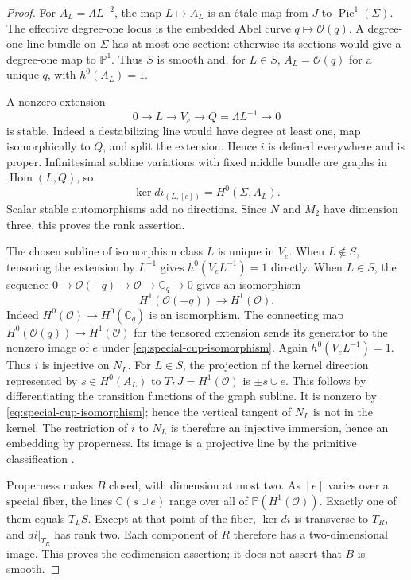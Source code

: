 \documentclass[11pt]{amsart}
\theoremstyle{definition}
\theoremstyle{remark}
\theoremstyle{plain}
\newcommand{\CC}{\mathbb{C}}
\newcommand{\PP}{\mathbb{P}}
\newcommand{\Hom}{\operatorname{Hom}}
\begin{document}
\begin{proof}
For $A_L=\Lambda L^{-2}$, the map $L\mapsto A_L$ is an
\'etale map from $J$ to $\operatorname{Pic}^1(\Sigma)$.
The effective degree-one locus is the embedded Abel curve
$q\mapsto\mathcal O(q)$. A degree-one line bundle on $\Sigma$
has at most one section: otherwise its sections would give a
degree-one map to $\PP^1$. Thus $S$ is smooth and, for $L\in S$,
$A_L=\mathcal O(q)$ for a unique $q$, with $h^0(A_L)=1$.

A nonzero extension
\[
 0\longrightarrow L\longrightarrow V_e
       \longrightarrow Q=\Lambda L^{-1}\longrightarrow0
\]
is stable. Indeed a destabilizing line would have degree at least
one, map isomorphically to $Q$, and split the extension.
Hence $i$ is defined everywhere and is proper. Infinitesimal
subline variations with fixed middle bundle are graphs in
$\Hom(L,Q)$, so
\begin{equation}\label{eq:special-extension-differential}
            \ker di_{(L,[e])}=H^0(\Sigma,A_L).
\end{equation}
Scalar stable automorphisms add no directions. Since $N$ and
$M_2$ have dimension three, this proves the rank assertion.

The chosen subline of isomorphism class $L$ is unique in $V_e$.
When $L\notin S$, tensoring the extension by $L^{-1}$ gives
$h^0(V_eL^{-1})=1$ directly. When $L\in S$, the sequence
$0\to\mathcal O(-q)\to\mathcal O\to\CC_q\to0$ gives an
isomorphism
\begin{equation}\label{eq:special-cup-isomorphism}
           H^1(\mathcal O(-q))\longrightarrow H^1(\mathcal O).
\end{equation}
Indeed $H^0(\mathcal O)\to H^0(\CC_q)$ is an isomorphism.
The connecting map $H^0(\mathcal O(q))\to H^1(\mathcal O)$
for the tensored extension sends its generator to the nonzero
image of $e$ under \eqref{eq:special-cup-isomorphism}.
Again $h^0(V_eL^{-1})=1$. Thus $i$ is injective on $N_L$.
For $L\in S$, the projection of the kernel direction represented
by $s\in H^0(A_L)$ to $T_LJ=H^1(\mathcal O)$ is
$\pm s\cup e$. This follows by differentiating the transition
functions of the graph subline. It is nonzero by
\eqref{eq:special-cup-isomorphism}; hence the vertical tangent
of $N_L$ is not in the kernel. The restriction of $i$ to $N_L$
is therefore an injective immersion, hence an embedding by
properness. Its image is a projective line by the primitive
classification \cite[Propositions~2--3]{Munoz99b}.

Properness makes $B$ closed, with dimension at most two.
As $[e]$ varies over a special fiber, the lines
$\CC(s\cup e)$ range over all of $\PP(H^1(\mathcal O))$.
Exactly one of them equals $T_LS$. Except at that point of
the fiber, $\ker di$ is transverse to $T_R$, and $di|_{T_R}$
has rank two. Each component of $R$ therefore has a
two-dimensional image. This proves the codimension assertion;
it does not assert that $B$ is smooth.


\end{proof}
\end{document}
